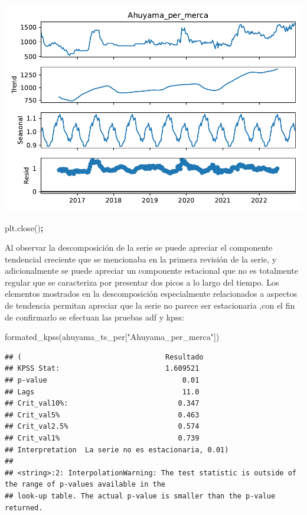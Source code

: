 \documentclass[
]{book}
\newenvironment{Shaded}{\begin{snugshade}}{\end{snugshade}}
\newcommand{\NormalTok}[1]{#1}
\newcommand{\OperatorTok}[1]{\textcolor[rgb]{0.81,0.36,0.00}{\textbf{#1}}}
\newcommand{\StringTok}[1]{\textcolor[rgb]{0.31,0.60,0.02}{#1}}
\begin{document}
\includegraphics{bookdown-demo_files/figure-latex/unnamed-chunk-88-63.pdf}

\begin{Shaded}
\begin{Highlighting}[]
\NormalTok{plt.close()}\OperatorTok{;}
\end{Highlighting}
\end{Shaded}

Al observar la descomposición de la serie se puede apreciar el componente tendencial creciente que se mencionaba en la primera revisión de la serie, y adicionalmente se puede apreciar un componente estacional que no es totalmente regular que se caracteriza por presentar dos picos a lo largo del tiempo. Los elementos mostrados en la descomposición especialmente relacionados a aspectos de tendencia permitan apreciar que la serie no parece ser estacionaria ,con el fin de confirmarlo se efectuan las pruebas adf y kpss:

\begin{Shaded}
\begin{Highlighting}[]

\NormalTok{formated\_kpss(ahuyama\_ts\_per[}\StringTok{"Ahuyama\_per\_merca"}\NormalTok{])}
\end{Highlighting}
\end{Shaded}

\begin{verbatim}
## (                                  Resultado
## KPSS Stat:                         1.609521
## p-value                                0.01
## Lags                                   11.0
## Crit_val10%:                          0.347
## Crit_val5%                            0.463
## Crit_val2.5%                          0.574
## Crit_val1%                            0.739
## Interpretation  La serie no es estacionaria, 0.01)
## 
## <string>:2: InterpolationWarning: The test statistic is outside of the range of p-values available in the
## look-up table. The actual p-value is smaller than the p-value returned.
\end{verbatim}
\end{document}
